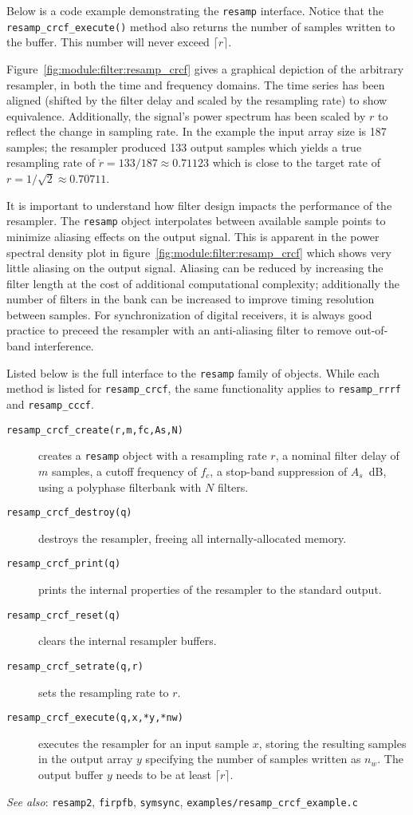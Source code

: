 Below is a code example demonstrating the {\tt resamp} interface.
Notice that the {\tt resamp\_crcf\_execute()} method also returns the number
of samples written to the buffer.
This number will never exceed $\lceil r \rceil$.
%

%
Figure~\ref{fig:module:filter:resamp_crcf} gives a graphical depiction
of the arbitrary resampler, in both the time and frequency domains.
The time series has been aligned (shifted by the filter delay and scaled by
the resampling rate) to show equivalence.
Additionally, the signal's power spectrum has been scaled by $r$ to reflect
the change in sampling rate.
In the example the input array size is 187 samples;
the resampler produced 133 output samples which yields a true resampling
rate of $\dot{r} = 133/187 \approx 0.71123$ which is close to the target
rate of $r = 1/\sqrt{2} \approx 0.70711$.

It is important to understand how filter design impacts the performance of the
resampler.
The {\tt resamp} object interpolates between available sample points to
minimize aliasing effects on the output signal.
This is apparent in the power spectral density plot in
figure~\ref{fig:module:filter:resamp_crcf} which shows very little aliasing on
the output signal.
Aliasing can be reduced by increasing the filter length at the cost of
additional computational complexity;
additionally the number of filters in the bank can be increased to
improve timing resolution between samples.
For synchronization of digital receivers, it is always good practice to
preceed the resampler with an anti-aliasing filter to remove out-of-band
interference.

Listed below is the full interface to the {\tt resamp} family of
objects.
While each method is listed for {\tt resamp\_crcf}, the same
functionality applies to {\tt resamp\_rrrf} and {\tt resamp\_cccf}.
%
\begin{description}
\item[{\tt resamp\_crcf\_create(r,m,fc,As,N)}]
    creates a {\tt resamp} object with a resampling rate $r$,
    a nominal filter delay of $m$ samples, a cutoff frequency of $f_c$,
    a stop-band suppression of $A_s$~dB, using a polyphase filterbank
    with $N$ filters.
\item[{\tt resamp\_crcf\_destroy(q)}]
    destroys the resampler, freeing all internally-allocated memory.
\item[{\tt resamp\_crcf\_print(q)}]
    prints the internal properties of the resampler to the standard
    output.
\item[{\tt resamp\_crcf\_reset(q)}]
    clears the internal resampler buffers.
\item[{\tt resamp\_crcf\_setrate(q,r)}]
    sets the resampling rate to $r$.
\item[{\tt resamp\_crcf\_execute(q,x,*y,*nw)}]
    executes the resampler for an input sample $x$,
    storing the resulting samples in the output array $y$
    specifying the number of samples written as $n_w$.
    The output buffer $y$ needs to be at least $\lceil r \rceil$.
\end{description}
%
{\em See also}: {\tt resamp2}, {\tt firpfb}, {\tt symsync},
{\tt examples/resamp\_crcf\_example.c}

